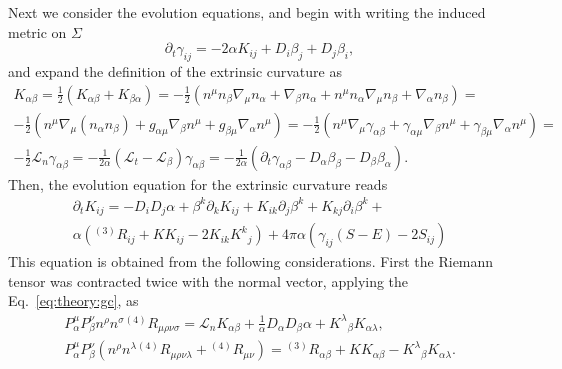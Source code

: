 Next we consider the evolution equations, and begin with writing the induced metric on $\Sigma$
%
%
\begin{equation}
    \partial_t\gamma_{ij} = -2\alpha K_{ij} + D_{i}\beta_j + D_j \beta_i,
    \label{eq:theory:evol_metric}
\end{equation}
%
and expand the definition of the extrinsic curvature as 
%
\begin{equation}
    \begin{aligned}
    K_{\alpha\beta} = \frac{1}{2}(K_{\alpha\beta} + K_{\beta\alpha}) = -\frac{1}{2}(n^{\mu}n_{\beta}\nabla_{\mu}n_{\alpha} + \nabla_{\beta}n_{\alpha}+n^{\mu}n_{\alpha}\nabla_{\mu}n_{\beta}+\nabla_{\alpha}n_{\beta}) = \\
    -\frac{1}{2}(n^{\mu}\nabla_{\mu}(n_{\alpha}n_{\beta}) +g_{\alpha\mu}\nabla_{\beta}n^{\mu} + g_{\beta\mu}\nabla_{\alpha}n^{\mu}) = -\frac{1}{2}(n^{\mu}\nabla_{\mu}\gamma_{\alpha\beta} + \gamma_{\alpha\mu} \nabla_{\beta} n^{\mu} + \gamma_{\beta\mu}\nabla_{\alpha}n^{\mu}) = \\
    -\frac{1}{2}\mathcal{L}_{n}\gamma_{\alpha\beta} = -\frac{1}{2\alpha}(\mathcal{L}_t - \mathcal{L}_{\beta})\gamma_{\alpha\beta} = -\frac{1}{2\alpha}(\partial_t\gamma_{\alpha\beta} - D_{\alpha}\beta_{\beta} - D_{\beta}\beta_{\alpha}).
    \end{aligned}
\end{equation}
%
Then, the evolution equation for the extrinsic curvature reads 
%
\begin{equation}
    \begin{aligned}
    \partial_t K_{ij} = -D_i D_j \alpha + \beta^k \partial_k K_{ij} + K_{ik}\partial_j \beta^k + K_{kj}\partial_i \beta^k + \\
    \alpha({^{(3)}R_{ij}} + KK_{ij} - 2K_{ik}{K^k}_j) + 4\pi \alpha (\gamma_{ij}(S-E) - 2S_{ij})
    \end{aligned}
    \label{eq:theory:evol_eq}
\end{equation}
%
This equation is obtained from the following considerations. 
First the Riemann tensor was contracted twice with the normal vector, applying the 
Eq.~\eqref{eq:theory:gc}, as 
%
\begin{subequations}
    \begin{align}
    P_{\alpha}^{\mu}P_{\beta}^{\nu}n^{\rho}n^{\sigma}{^{(4)}R_{\mu\rho\nu\sigma}} = \mathcal{L}_{n} K_{\alpha\beta} + \frac{1}{\alpha} D_{\alpha}D_{\beta}\alpha + {K^{\lambda}}_{\beta}K_{\alpha\lambda}, \label{eq:theory:for_ev1}\\
    P_{\alpha}^{\mu}P_{\beta}^{\nu}(n^{\rho}n^{\lambda} {^{(4)}R_{\mu\rho\nu\lambda}} + {^{(4)}R_{\mu\nu}}) = 
    {^{(3)}R_{\alpha\beta}} + KK_{\alpha\beta} - {K^{\lambda}}_{\beta}K_{\alpha\lambda}. \label{eq:theory:for_ev2}
    \end{align}
\end{subequations}
